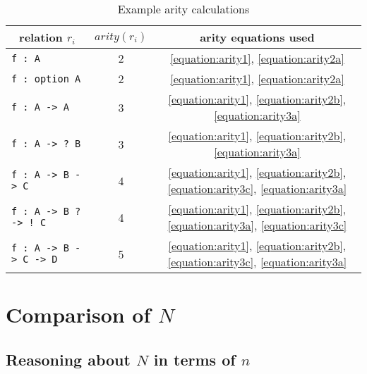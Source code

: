         \begin{singlespacing}
        \begin{table}[H]
        \begin{center}
        \caption{Example arity calculations}\label{table:arity}
        \bigskip
        \begin{tabular}{|l|c|c|}\hline
        \multicolumn{1}{|c|}{relation $r_i$} & \multicolumn{1}{c|}{$arity(r_i)$} & \multicolumn{1}{c|}{arity equations used} \\ \hline
        \verb|f : A |                    & 2 & \eqref{equation:arity1}, \eqref{equation:arity2a} \\ \hline
        \verb|f : option A|              & 2 & \eqref{equation:arity1}, \eqref{equation:arity2a} \\ \hline
        \verb|f : A -> A|                & 3 & \eqref{equation:arity1}, \eqref{equation:arity2b}, \eqref{equation:arity3a} \\ \hline
        \verb|f : A -> ? B|              & 3 & \eqref{equation:arity1}, \eqref{equation:arity2b}, \eqref{equation:arity3a} \\ \hline
        \verb|f : A -> B -> C|           & 4 & \eqref{equation:arity1}, \eqref{equation:arity2b}, \eqref{equation:arity3c}, \eqref{equation:arity3a} \\ \hline
        \verb|f : A -> B ? -> ! C|       & 4 & \eqref{equation:arity1}, \eqref{equation:arity2b}, \eqref{equation:arity3a}, \eqref{equation:arity3c} \\ \hline
        \verb|f : A -> B -> C -> D|      & 5 & \eqref{equation:arity1}, \eqref{equation:arity2b}, \eqref{equation:arity3c}, \eqref{equation:arity3a} \\ \hline
        \end{tabular}
        \end{center}
        \end{table}
        \end{singlespacing}

\section{Comparison of $N$}\label{AppSec:CompareN}



\subsection{Reasoning about $N$ in terms of $n$}\label{AppSec:Nandn}

